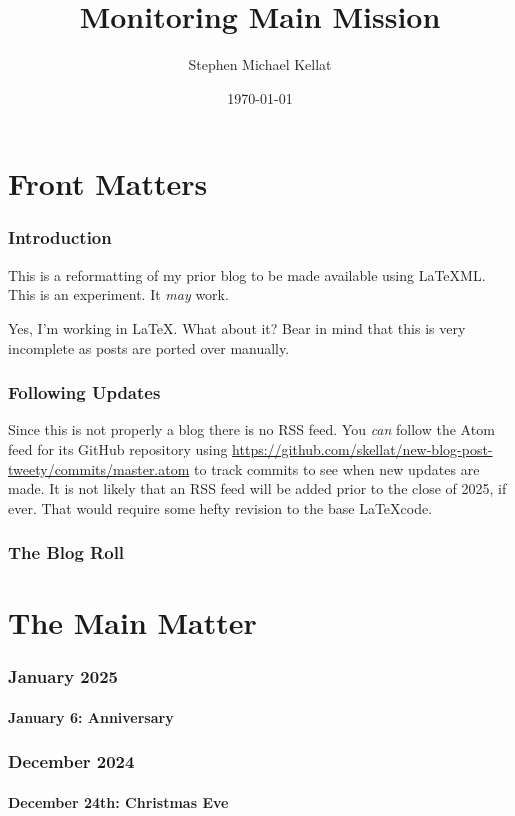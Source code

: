 \documentclass[12pt,letterpaper]{report}
\title{Monitoring Main Mission}
\author{Stephen Michael Kellat}
\date{\today}
\begin{document}
\maketitle
\tableofcontents
\part{Front Matters}
\section{Introduction}
This is a reformatting of my prior blog to be made available using LaTeXML.  This is an experiment.  It \emph{may} work.  

Yes, I'm working in \LaTeX.  What about it?  Bear in mind that this is very incomplete as posts are ported over manually.
\section{Following Updates}
Since this is not properly a blog there is no RSS feed.  You \emph{can} follow the Atom feed for its GitHub repository using \url{https://github.com/skellat/new-blog-post-tweety/commits/master.atom} to track commits to see when new updates are made.  It is not likely that an RSS feed will be added prior to the close of 2025, if ever.  That would require some hefty revision to the base \LaTeX code.
\section{The Blog Roll}

\part{The Main Matter}
\section{January 2025}
\subsection{January 6: Anniversary}

\section{December 2024}
\subsection{December 24th: Christmas Eve}

\end{document}
